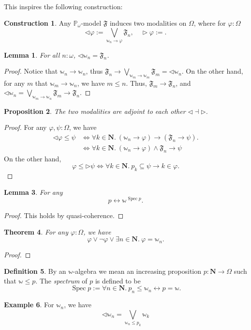\documentclass[a4paper,10pt]{amsart}
\newtheorem{theorem}{Theorem}[section]
\newtheorem{lemma}[theorem]{Lemma}
\newtheorem{proposition}[theorem]{Proposition}
\theoremstyle{definition}
\newtheorem{example}[theorem]{Example}
\newtheorem{definition}[theorem]{Definition}
\newtheorem{construction}{Construction}
\newcommand{\mb}[1]{\mathbf{#1}}
\newcommand{\mbb}[1]{\mathbb{#1}}
\newcommand{\mf}[1]{\mathfrak{#1}}
\newcommand{\eff}{\Leftrightarrow}
\newcommand{\N}{\mb N}
\newcommand{\fa}[2]{\forall #1\in #2.\ }
\newcommand{\ex}[2]{\exists #1\in #2.\ }
\newcommand{\eq}{\leftrightarrow}
\newcommand{\spec}{\operatorname{Spec}}
\newcommand{\pw}{\mbb P_\omega}
\newcommand{\um}{\mbb w}
\newcommand{\prev}{\triangleleft}
\newcommand{\latt}{\triangleright}
\begin{document}
This inspires the following construction:

\begin{construction}
  Any $\pw$-model $\mf F$ induces two modalities on $\Omega$, where for $\varphi : \Omega$
  \[ \prev\varphi := \bigvee_{\um_n \to \varphi} \mf F_n, \quad \latt\varphi := . \]
\end{construction}

\begin{lemma}
  For all $n : \omega$, $\prev\um_n = \mf F_n$.
\end{lemma}
\begin{proof}
  Notice that $\um_n \to \um_n$, thus $\mf F_n \to \bigvee_{\um_m\to\um_m}\mf F_m = \prev\um_n$. On the other hand, for any $m$ that $\um_m \to \um_n$, we have $m \le n$. Thus, $\mf F_m \to \mf F_n$, and $\prev\um_n = \bigvee_{\um_m \to \um_n}\mf F_m \to \mf F_n$.
\end{proof}

\begin{proposition}
  The two modalities are adjoint to each other $\prev \dashv \latt$.
\end{proposition}
\begin{proof}
  For any $\varphi,\psi : \Omega$, we have 
  \begin{align*}
    \prev\varphi \le \psi 
    &\eff \fa k\N (\um_n \to \varphi) \to (\mf F_n \to \psi). \\
    &\eff \fa k\N (\um_n \to \varphi) \wedge \mf F_n \to \psi
  \end{align*}
  On the other hand,
  \[ \varphi \le \latt\psi \eff \fa k\N p_k \subseteq \psi \to k \in \varphi. \]
\end{proof}

\begin{lemma}
  For any 
  \[ p \eq \um^{\spec p}. \]
\end{lemma}
\begin{proof}
  This holds by quasi-coherence.
\end{proof}

\begin{theorem}
  For any $\varphi : \Omega$, we have 
  \[ \varphi \vee \neg\varphi \vee \ex n\N \varphi = \um_n. \]
\end{theorem}
\begin{proof}
  
\end{proof}



\begin{definition}
  By an $\um$-algebra we mean an increasing proposition $p : \N \to \Omega$ such that $\um \le p$. The \emph{spectrum} of $p$ is defined to be
  \[ \spec p := \fa n\N p_n \le \um_n \eq p = \um. \]
\end{definition}




\begin{example}
  For $\um_n$, we have 
  \[ \prev\um_n = \bigvee_{\um_n \le p_k} \um_k \]
\end{example}

 

\end{document}
